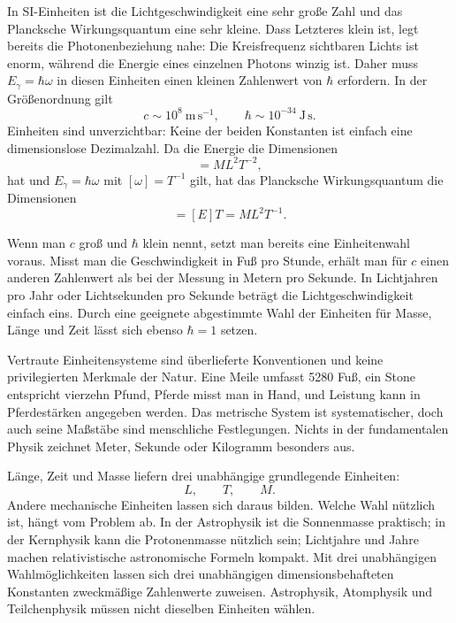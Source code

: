 In SI-Einheiten ist die Lichtgeschwindigkeit eine sehr große Zahl und das Plancksche Wirkungsquantum eine sehr kleine. Dass Letzteres klein ist, legt bereits die Photonenbeziehung nahe: Die Kreisfrequenz sichtbaren Lichts ist enorm, während die Energie eines einzelnen Photons winzig ist. Daher muss \(E_\gamma=\hbar\omega\) in diesen Einheiten einen kleinen Zahlenwert von \(\hbar\) erfordern. In der Größenordnung gilt
\begin{equation}
c\sim 10^8\ \mathrm{m\,s^{-1}},
\qquad
\hbar\sim 10^{-34}\ \mathrm{J\,s}.
\end{equation}
Einheiten sind unverzichtbar: Keine der beiden Konstanten ist einfach eine dimensionslose Dezimalzahl. Da die Energie die Dimensionen
\begin{equation}
[E]=M L^2 T^{-2},
\end{equation}
hat und \(E_\gamma=\hbar\omega\) mit \([\omega]=T^{-1}\) gilt, hat das Plancksche Wirkungsquantum die Dimensionen
\begin{equation}
[\hbar]=[E]T=M L^2 T^{-1}.
\end{equation}

Wenn man \(c\) groß und \(\hbar\) klein nennt, setzt man bereits eine Einheitenwahl voraus. Misst man die Geschwindigkeit in Fuß pro Stunde, erhält man für \(c\) einen anderen Zahlenwert als bei der Messung in Metern pro Sekunde. In Lichtjahren pro Jahr oder Lichtsekunden pro Sekunde beträgt die Lichtgeschwindigkeit einfach eins. Durch eine geeignete abgestimmte Wahl der Einheiten für Masse, Länge und Zeit lässt sich ebenso \(\hbar=1\) setzen.

Vertraute Einheitensysteme sind überlieferte Konventionen und keine privilegierten Merkmale der Natur. Eine Meile umfasst 5280 Fuß, ein Stone entspricht vierzehn Pfund, Pferde misst man in Hand, und Leistung kann in Pferdestärken angegeben werden. Das metrische System ist systematischer, doch auch seine Maßstäbe sind menschliche Festlegungen. Nichts in der fundamentalen Physik zeichnet Meter, Sekunde oder Kilogramm besonders aus.

Länge, Zeit und Masse liefern drei unabhängige grundlegende Einheiten:
\begin{equation}
L,\qquad T,\qquad M.
\end{equation}
Andere mechanische Einheiten lassen sich daraus bilden. Welche Wahl nützlich ist, hängt vom Problem ab. In der Astrophysik ist die Sonnenmasse praktisch; in der Kernphysik kann die Protonenmasse nützlich sein; Lichtjahre und Jahre machen relativistische astronomische Formeln kompakt. Mit drei unabhängigen Wahlmöglichkeiten lassen sich drei unabhängigen dimensionsbehafteten Konstanten zweckmäßige Zahlenwerte zuweisen. Astrophysik, Atomphysik und Teilchenphysik müssen nicht dieselben Einheiten wählen.

